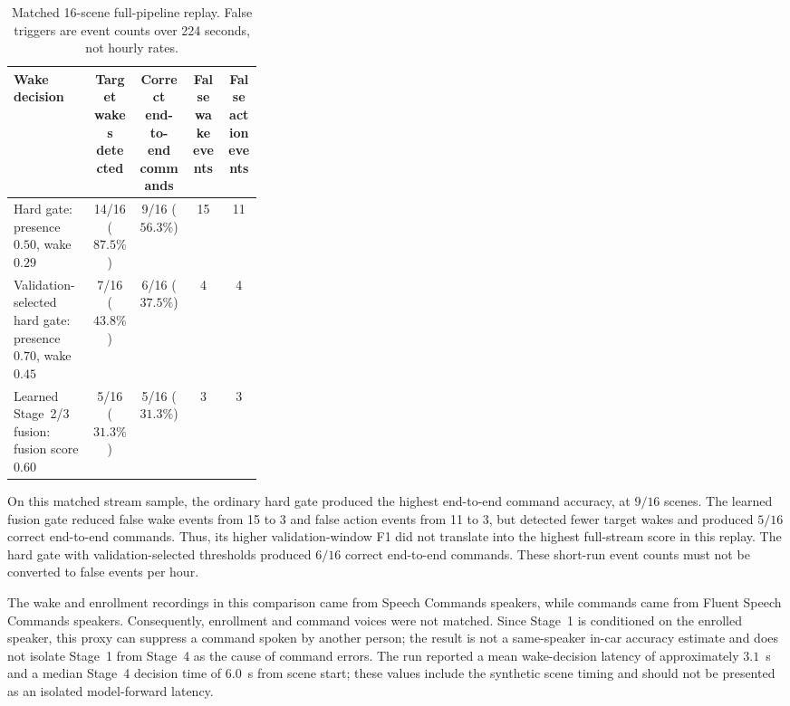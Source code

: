 \begin{table}[t]
\centering
\small
\caption{Matched 16-scene full-pipeline replay. False triggers are event counts over 224 seconds, not hourly rates.}
\label{tab:stream-results-updated}
\begin{tabular}{p{0.32\linewidth}cccc}
\hline
Wake decision & Target wakes detected & Correct end-to-end commands & False wake events & False action events \\
\hline
Hard gate: presence $0.50$, wake $0.29$ & 14/16 ($87.5\%$) & 9/16 ($56.3\%$) & 15 & 11 \\
Validation-selected hard gate: presence $0.70$, wake $0.45$ & 7/16 ($43.8\%$) & 6/16 ($37.5\%$) & 4 & 4 \\
Learned Stage~2/3 fusion: fusion score $0.60$ & 5/16 ($31.3\%$) & 5/16 ($31.3\%$) & 3 & 3 \\
\hline
\end{tabular}
\end{table}

On this matched stream sample, the ordinary hard gate produced the highest end-to-end command accuracy, at $9/16$ scenes. The learned fusion gate reduced false wake events from 15 to 3 and false action events from 11 to 3, but detected fewer target wakes and produced $5/16$ correct end-to-end commands. Thus, its higher validation-window F1 did not translate into the highest full-stream score in this replay. The hard gate with validation-selected thresholds produced $6/16$ correct end-to-end commands. These short-run event counts must not be converted to false events per hour.

The wake and enrollment recordings in this comparison came from Speech Commands speakers, while commands came from Fluent Speech Commands speakers. Consequently, enrollment and command voices were not matched. Since Stage~1 is conditioned on the enrolled speaker, this proxy can suppress a command spoken by another person; the result is not a same-speaker in-car accuracy estimate and does not isolate Stage~1 from Stage~4 as the cause of command errors. The run reported a mean wake-decision latency of approximately $3.1$~s and a median Stage~4 decision time of $6.0$~s from scene start; these values include the synthetic scene timing and should not be presented as an isolated model-forward latency.

